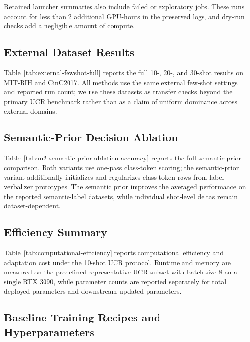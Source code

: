 \documentclass{article}
\begin{document}
Retained launcher summaries also include failed or exploratory jobs. These runs
account for less than 2 additional GPU-hours in the preserved logs, and dry-run
checks add a negligible amount of compute.

\subsection{External Dataset Results}
\label{app:external-results}

Table~\ref{tab:external-fewshot-full} reports the full 10-, 20-, and 30-shot results on MIT-BIH and CinC2017. All methods use the same external few-shot settings and reported run count; we use these datasets as transfer checks beyond the primary UCR benchmark rather than as a claim of uniform dominance across external domains.



\subsection{Semantic-Prior Decision Ablation}
\label{app:semantic-prior-ablation}

Table~\ref{tab:m2-semantic-prior-ablation-accuracy} reports the full semantic-prior comparison. Both variants use one-pass class-token scoring; the semantic-prior variant additionally initializes and regularizes class-token rows from label-verbalizer prototypes. The semantic prior improves the averaged performance on the reported semantic-label datasets, while individual shot-level deltas remain dataset-dependent.



\subsection{Efficiency Summary}
\label{app:efficiency-summary}

Table~\ref{tab:computational-efficiency} reports computational efficiency and adaptation cost under the 10-shot UCR protocol. Runtime and memory are measured on the predefined representative UCR subset with batch size 8 on a single RTX 3090, while parameter counts are reported separately for total deployed parameters and downstream-updated parameters.



\subsection{Baseline Training Recipes and Hyperparameters}
\label{app:baseline-details}
\end{document}
